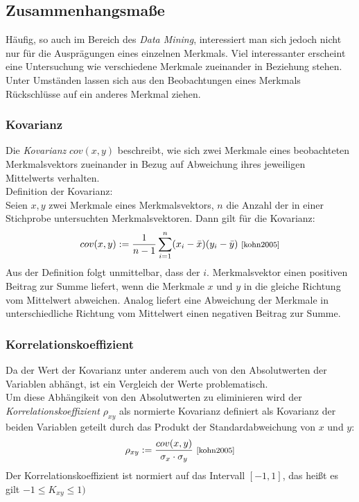 \documentclass[fontsize=11pt]{scrartcl}
\begin{document}
                \subsection{Zusammenhangsmaße}
                    Häufig, so auch im Bereich des \emph{Data Mining}, interessiert man sich jedoch nicht nur für die Ausprägungen eines einzelnen Merkmals. Viel interessanter erscheint eine Untersuchung wie verschiedene Merkmale zueinander in Beziehung stehen. Unter Umständen lassen sich aus den Beobachtungen eines Merkmals Rückschlüsse auf ein anderes Merkmal ziehen.
                    
                    \subsubsection{Kovarianz}
                        Die \emph{Kovarianz} $cov(x,y)$ beschreibt, wie sich zwei Merkmale eines beobachteten Merkmalsvektors zueinander in Bezug auf Abweichung ihres jeweiligen Mittelwerts verhalten.\cite{ertel2016}\\
                        Definition der Kovarianz:\\
                        Seien $x,y$ zwei Merkmale eines Merkmalsvektors, $n$ die Anzahl der in einer Stichprobe untersuchten Merkmalsvektoren. Dann gilt für die Kovarianz:
                        $$
                            cov(x,y) := \frac{1}{n-1}\sum_{i=1}^n(x_i - \bar{x})(y_i - \bar{y}) \text{ \footnotesize\cite[S.121]{kohn2005}}
                        $$
                        Aus der Definition folgt unmittelbar, dass der $i$. Merkmalsvektor einen positiven Beitrag zur Summe liefert, wenn die Merkmale $x$ und $y$ in die gleiche Richtung vom Mittelwert abweichen. Analog liefert eine Abweichung der Merkmale in unterschiedliche Richtung vom Mittelwert einen negativen Beitrag zur Summe. \cite{ertel2016}

                    \subsubsection{Korrelationskoeffizient}
                        Da der Wert der Kovarianz unter anderem auch von den Absolutwerten der Variablen abhängt, ist ein Vergleich der Werte problematisch.
                        \cite{ertel2016} \\
                        Um diese Abhängikeit von den Absolutwerten zu eliminieren wird der \emph{Korrelationskoeffizient $\rho_{xy}$} als normierte Kovarianz definiert als Kovarianz der beiden Variablen geteilt durch das Produkt der Standardabweichung von $x$ und $y$:
                        $$
                            \rho_{xy} := \frac{cov(x,y)}{\sigma_x \cdot \sigma_y} \text{ \footnotesize\cite[S.122]{kohn2005}}
                        $$
                        Der Korrelationskoeffizient ist normiert auf das Intervall $[-1,1]$, das heißt es gilt $-1 \leq K_{xy} \leq 1)$
                        \cite{kohn2005}
\end{document}
